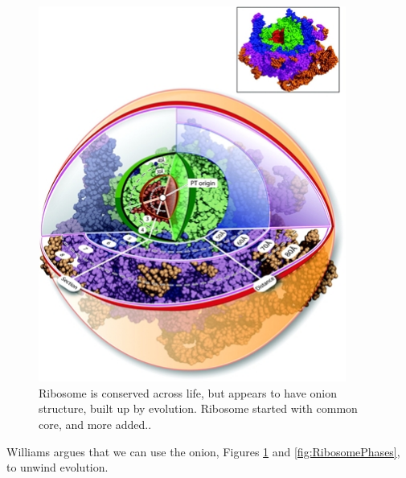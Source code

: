 \documentclass[]{article}
\begin{document}
\begin{figure}[H]
	\caption[Ribosome is conserved across life]{Ribosome is conserved across life, but appears to have onion structure, built up by evolution. Ribosome started with common core, and more added.\cite{hsiao2009peeling}.}\label{fig:Ribosome} 
	\includegraphics[width=0.9\textwidth]{Ribosome}
\end{figure}
Williams argues that we can use the onion, Figures \ref{fig:Ribosome} and \ref{fig:RibosomePhases}, to unwind evolution.
\end{document}
